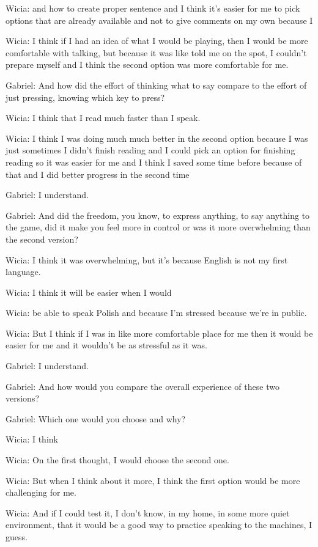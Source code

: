 Wicia: and how to create proper sentence and I think it's easier for me to pick options that are already available and not to give comments on my own because I

Wicia: I think if I had an idea of what I would be playing, then I would be more comfortable with talking, but because it was like told me on the spot, I couldn't prepare myself and I think the second option was more comfortable for me.

Gabriel: And how did the effort of thinking what to say compare to the effort of just pressing, knowing which key to press?

Wicia: I think that I read much faster than I speak.

Wicia: I think I was doing much much better in the second option because I was just sometimes I didn't finish reading and I could pick an option for finishing reading so it was easier for me and I think I saved some time before because of that and I did better progress in the second time

Gabriel: I understand.

Gabriel: And did the freedom, you know, to express anything, to say anything to the game, did it make you feel more in control or was it more overwhelming than the second version?

Wicia: I think it was overwhelming, but it's because English is not my first language.

Wicia: I think it will be easier when I would

Wicia: be able to speak Polish and because I'm stressed because we're in public.

Wicia: But I think if I was in like more comfortable place for me then it would be easier for me and it wouldn't be as stressful as it was.

Gabriel: I understand.

Gabriel: And how would you compare the overall experience of these two versions?

Gabriel: Which one would you choose and why?

Wicia: I think

Wicia: On the first thought, I would choose the second one.

Wicia: But when I think about it more, I think the first option would be more challenging for me.

Wicia: And if I could test it, I don't know, in my home, in some more quiet environment, that it would be a good way to practice speaking to the machines, I guess.

